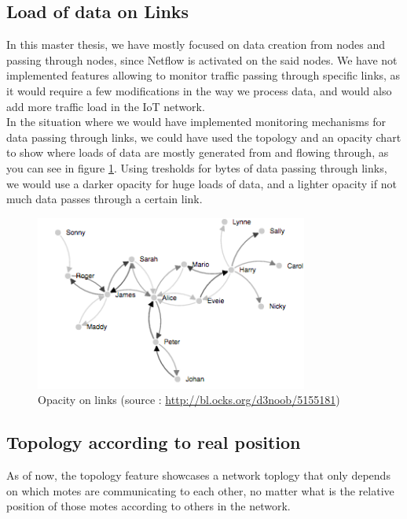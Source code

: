 \subsection{Load of data on Links}

In this master thesis, we have mostly focused on data creation from nodes and passing through nodes, since Netflow is activated on the said nodes. We have not implemented features allowing to monitor traffic passing through specific links, as it would require a few modifications in the way we process data, and would also add more traffic load in the IoT network.\\

In the situation where we would have implemented monitoring mechanisms for data passing through links, we could have used the topology and an opacity chart to show where loads of data are mostly generated from and flowing through, as you can see in figure \ref{fig:opacity}. Using tresholds for bytes of data passing through links, we would use a darker opacity for huge loads of data, and a lighter opacity if not much data passes through a certain link.

\begin{figure}[!h]
	\centering
	\includegraphics[width=0.8\textwidth]{res/opacity.png}
	\caption{Opacity on links (source : \url{http://bl.ocks.org/d3noob/5155181})}
	\label{fig:opacity}
\end{figure}

\subsection{Topology according to real position}

As of now, the topology feature showcases a network toplogy that only depends on which motes are communicating to each other, no matter what is the relative position of those motes according to others in the network. \\

